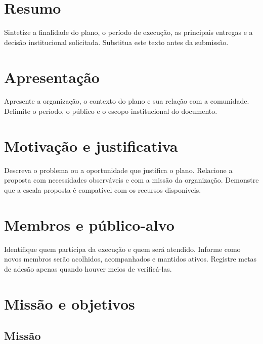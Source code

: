 \documentclass[
  paper-size=a4,
  font-size=11pt,
  two-sided=true,
  title-page=true,
  section-numbering=plain,
  inner-margin=22mm,
  outer-margin=22mm,
  top-margin=24mm,
  bottom-margin=28mm,
  binding-offset=0mm,
  color-model=rgb
]{ieeeufgcs}
\begin{document}
\maketitle

\section*{Resumo}

Sintetize a finalidade do plano, o período de execução, as principais
entregas e a decisão institucional solicitada. Substitua este texto antes
da submissão.

\clearpage
\tableofcontents
\clearpage

\section{Apresentação}\label{sec:apresentacao}

Apresente a organização, o contexto do plano e sua relação com a comunidade.
Delimite o período, o público e o escopo institucional do documento.

\section{Motivação e justificativa}

Descreva o problema ou a oportunidade que justifica o plano. Relacione a
proposta com necessidades observáveis e com a missão da organização.
Demonstre que a escala proposta é compatível com os recursos disponíveis.

\section{Membros e público-alvo}

Identifique quem participa da execução e quem será atendido. Informe como
novos membros serão acolhidos, acompanhados e mantidos ativos. Registre
metas de adesão apenas quando houver meios de verificá-las.

\section{Missão e objetivos}

\subsection{Missão}
\end{document}
